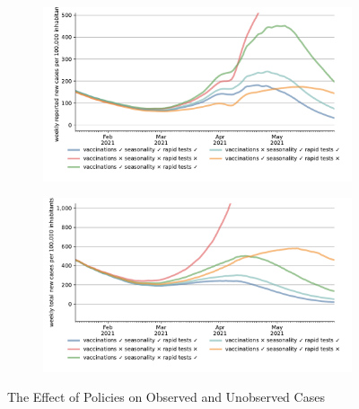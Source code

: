 \begin{figure}[ht]
  \centering
  \begin{subfigure}{.6\textwidth}
    \includegraphics[width=0.9 \textwidth]{../figures/results/figures/scenario_comparisons/one_off_and_combined/full_new_known_case_cropped}
  \end{subfigure}%
  \begin{subfigure}{.6\textwidth}
    \includegraphics[width=0.9 \textwidth]{../figures/results/figures/scenario_comparisons/one_off_and_combined/full_newly_infected_cropped}
  \end{subfigure}
  \caption{The Effect of Policies on Observed and Unobserved Cases}
  \label{fig:explain_decline}
\end{figure}



